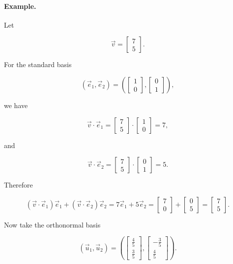 \paragraph{Example.}
Let

\[
\vec v=
\begin{bmatrix}
7\\
5
\end{bmatrix}.
\]

For the standard basis

\[
(\vec e_1,\vec e_2)
=
\left(
\begin{bmatrix}
1\\
0
\end{bmatrix},
\begin{bmatrix}
0\\
1
\end{bmatrix}
\right),
\]

we have

\[
\vec v\cdot \vec e_1
=
\begin{bmatrix}
7\\
5
\end{bmatrix}
\cdot
\begin{bmatrix}
1\\
0
\end{bmatrix}
=
7,
\]

and

\[
\vec v\cdot \vec e_2
=
\begin{bmatrix}
7\\
5
\end{bmatrix}
\cdot
\begin{bmatrix}
0\\
1
\end{bmatrix}
=
5.
\]

Therefore

\[
(\vec v\cdot \vec e_1)\vec e_1
+
(\vec v\cdot \vec e_2)\vec e_2
=
7\vec e_1+5\vec e_2
=
\begin{bmatrix}
7\\
0
\end{bmatrix}
+
\begin{bmatrix}
0\\
5
\end{bmatrix}
=
\begin{bmatrix}
7\\
5
\end{bmatrix}.
\]

Now take the orthonormal basis

\[
(\vec u_1,\vec u_2)
=
\left(
\begin{bmatrix}
\frac45\\[2pt]
\frac35
\end{bmatrix},
\begin{bmatrix}
-\frac35\\[2pt]
\frac45
\end{bmatrix}
\right).
\]

